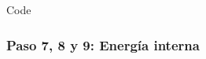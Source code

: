 \documentclass{beamer}
\begin{document}
\begin{frame}[fragile]{Code}
\frametitle{Paso 7, 8 y 9: Energía interna}

\end{frame}
\end{document}
